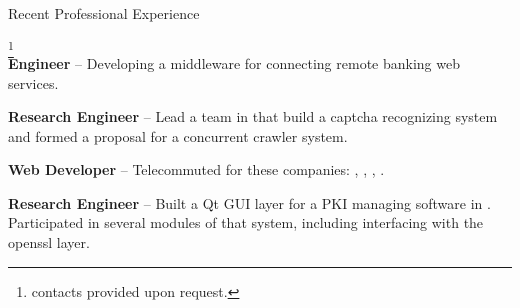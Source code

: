 \begin{rubric}{Recent Professional Experience}{
    \footnote{contacts provided upon request.}  \\

    \entry*[2012 - Present] \textbf{Engineer} -- Developing a
    middleware for
    connecting remote banking web services.

    \entry*[2010 - 2012] \textbf{Research Engineer} -- Lead a team in
     that build a
    captcha recognizing system and formed a proposal for a concurrent
    crawler system.

    \entry*[2007-2009] \textbf{Web Developer} -- Telecommuted for these companies:
    ,
    ,
    ,
    .

    \entry*[2005 - 2007] \textbf{Research Engineer} -- Built a Qt GUI
    layer for a PKI managing software in
    . Participated
    in several modules of that system, including interfacing with the
    openssl layer.

  }
\end{rubric}
